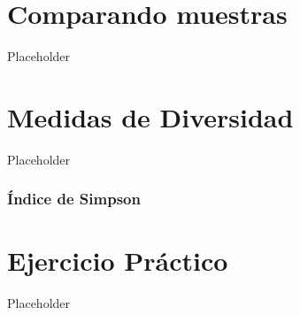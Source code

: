 \documentclass[]{book}
\begin{document}
\chapter{Comparando muestras}\label{comparando-muestras}

Placeholder

\chapter{Medidas de Diversidad}\label{medidas-de-diversidad}

Placeholder

\subsection{Índice de Simpson}\label{indice-de-simpson}

\chapter{Ejercicio Práctico}\label{ejercicio-practico}

Placeholder


\end{document}
